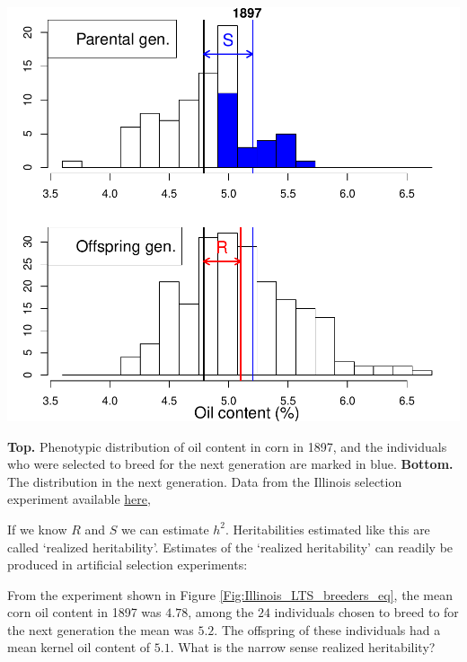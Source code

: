 \begin{marginfigure}
\begin{center}
\includegraphics[width=\textwidth]{Journal_figs/Quant_gen/Illinois_long_term_selection_corn/Illinois_LTS_breeders_eq.pdf}
\end{center}
\caption{{\bf Top.} Phenotypic distribution of oil content in corn in
  1897, and the individuals who were selected to breed for the next
  generation are marked in blue.   {\bf Bottom.} The distribution in the next generation. Data from the
  Illinois selection experiment available \href{https://www.ideals.illinois.edu/handle/2142/3525}{here}, }  \label{Fig:Illinois_LTS_breeders_eq}
\end{marginfigure}

If we know $R$ and $S$ we can estimate $h^2$. Heritabilities estimated
like this are called `realized heritability'. Estimates of the
`realized heritability' can readily be produced in artificial selection experiments:
\begin{question}{}
  From the experiment shown in Figure \ref{Fig:Illinois_LTS_breeders_eq},
  the mean corn oil content in 1897 was $4.78$, among the $24$ individuals
chosen to breed to for the next generation the mean was $5.2$. The
offspring of these individuals had a mean kernel oil content of
$5.1$. What is the narrow sense realized heritability? 
\end{question}

